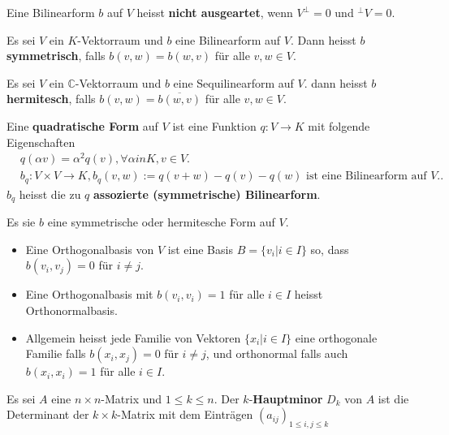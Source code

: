 \documentclass[../Algebra_script.tex]{subfiles}
\begin{document}
    \begin{definition}
        Eine Bilinearform $b$ auf $V$ heisst \textbf{nicht ausgeartet}, wenn $V^{\perp} = 0$ und ${}^{\perp}V = 0$.
    \end{definition}

    \begin{definition}
        Es sei $V$ ein $K$-Vektorraum und $b$ eine Bilinearform auf $V$. Dann heisst $b$ \textbf{symmetrisch}, falls $b(v, w) = b(w, v)$ für alle $v, w \in V$.

        Es sei $V$ ein $\mathbb{C}$-Vektorraum und $b$ eine Sequilinearform auf $V$. dann heisst $b$ \textbf{hermitesch}, falls $b(v, w) = \overline{b(w, v)}$ 
        für alle $v, w \in V$.
    \end{definition}

    \begin{definition}
        Eine \textbf{quadratische Form} auf $V$ ist eine Funktion $q: V \to K$ mit folgende Eigenschaften
        \begin{align*}
            &q(\alpha v) = \alpha^2 q(v), \forall \alpha in K, v \in V.\\
            &b_{q} : V \times V \to K, b_{q}(v, w) := q(v + w) - q(v) - q(w) \text{ ist eine Bilinearform auf } V.
        .\end{align*}
        $b_{q}$ heisst die zu $q$ \textbf{assozierte (symmetrische) Bilinearform}.
    \end{definition}

    \begin{definition}[Orthonormalbasis]
        Es sie $b$ eine symmetrische oder hermitesche Form auf $V$.
        \begin{itemize}
            \item Eine Orthogonalbasis von $V$ ist eine Basis $B = \{v_{i}| i \in I\}$ so, dass $b(v_{i}, v_{j}) = 0$ für $i\neq j$.
            \item Eine Orthogonalbasis mit $b(v_{i}, v_{i}) = 1$ für alle $i \in I$ heisst Orthonormalbasis.
            \item Allgemein heisst jede Familie von Vektoren $\{x_{i} | i \in I\}$ eine orthogonale Familie falls $b(x_{i},x_{j}) = 0$ für $i \neq j$, und
                orthonormal falls auch $b(x_{i},x_{i}) = 1$ für alle $i \in I$.
        \end{itemize}
    \end{definition}

    \begin{definition}[Hauptminor]
        Es sei $A$ eine $n \times n$-Matrix und $1 \le k \le n$. Der $k$-\textbf{Hauptminor} $D_{k}$ von $A$ ist die Determinant der $k \times k$-Matrix mit dem
        Einträgen $(a_{ij})_{1\le i,j \le k}$
    \end{definition}
\end{document}
